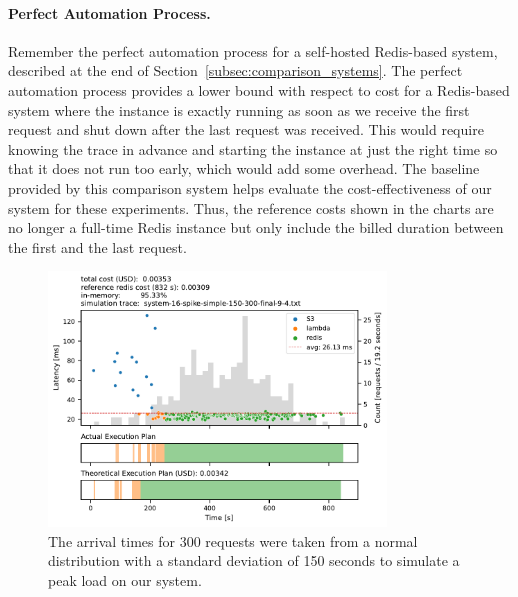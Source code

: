 \paragraph{Perfect Automation Process.}
Remember the perfect automation process for a self-hosted Redis-based system, described at the end of Section~\ref{subsec:comparison_systems}. The perfect automation process provides a lower bound with respect to cost for a Redis-based system where the instance is exactly running as soon as we receive the first request and shut down after the last request was received. This would require knowing the trace in advance and starting the instance at just the right time so that it does not run too early, which would add some overhead. The baseline provided by this comparison system helps evaluate the cost-effectiveness of our system for these experiments. Thus, the reference costs shown in the charts are no longer a full-time Redis instance but only include the billed duration between the first and the last request.

\begin{figure}[t]
    \begin{center}
        \includegraphics[width=0.8\textwidth]{figures/system-16-spike-simple-150-300-final-9-4.pdf}
        \caption{The arrival times for 300 requests were taken from a normal distribution with a standard deviation of 150 seconds to simulate a peak load on our system.}
        \label{fig:spike_3}
    \end{center}
\end{figure}

